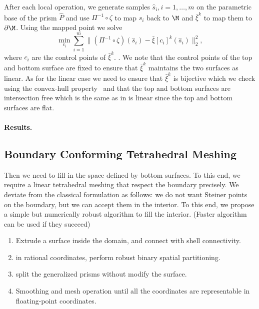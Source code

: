 After each local operation, we generate samples $\hat s_i, i=1,\dots,m$ on the parametric base of the prism $\hat P$ and use $\Pi^{-1}\circ \zeta$ to map $s_i$ back to $\M$ and $\bar \xi^k$ to map them to $\partial\M$. Using the mapped point we solve
\[
\min_{c_i} \sum_{i=1}^m \|
(\Pi^{-1}\circ \zeta)(\hat s_i) - 
\bar \xi[c_i]^k(\hat s_i)
\|_2^2,
\]
where $c_i$ are the control points of $\bar\xi^k$. 
.
We note that the control points of the top and bottom surface are fixed to ensure that $\bar\xi^k$ maintains the two surfaces as linear. As for the linear case we need to ensure that $\bar\xi^k$ is bijective which we check using the convex-hull property~\cite{johnen2013geometrical} and that the top and bottom surfaces are intersection free which is the same as in is linear since the top and bottom surfaces are flat.


\paragraph{Results.} 


\subsection{Boundary Conforming Tetrahedral Meshing}\label{sec:tets}

Then we need to fill in the space defined by bottom surfaces.
To this end, we require a linear tetrahedral meshing that respect the boundary precisely.
We deviate from the classical formulation
\cite{chew1989constrained,alexa2020conforming} as follows: we do not want Steiner points on the boundary, but we can accept them in the interior.
To this end, we propose a simple but numerically robust algorithm to fill the interior. (Faster algorithm can be used if they succeed)
\begin{enumerate}
    \item Extrude a surface inside the domain, and connect with shell connectivity.
    \item in rational coordinates, perform robust binary spatial partitioning.
    \item split the generalized prisms without modify the surface.
    \item Smoothing and mesh operation until all the coordinates are representable in floating-point coordinates. \cite{hu2018tetrahedral}
\end{enumerate}

